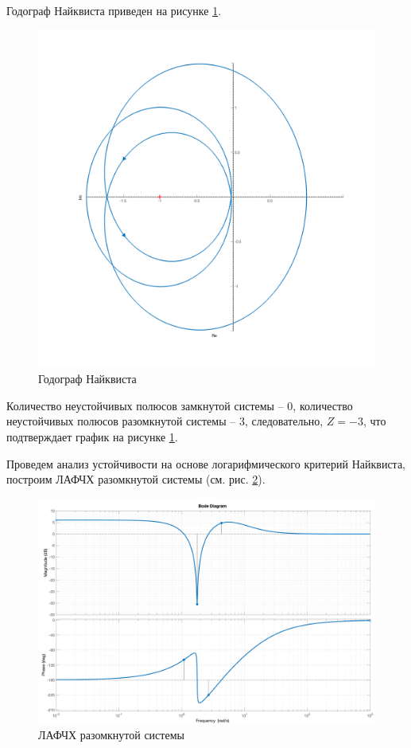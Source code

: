 Годограф Найквиста приведен на рисунке \ref{fig:task3_nyquist}.
\begin{figure}[ht!]
    \centering
    \includegraphics[width=\textwidth]{media/plots/task3_nyquist_open.png}
    \caption{Годограф Найквиста}
    \label{fig:task3_nyquist}
\end{figure}

Количество неустойчивых полюсов замкнутой системы -- 0, количество неустойчивых полюсов разомкнутой системы -- 3, следовательно, $Z = -3$, что подтверждает график на рисунке \ref{fig:task3_nyquist}.

Проведем анализ устойчивости на основе логарифмического критерий Найквиста, построим ЛАФЧХ разомкнутой системы (см. рис. \ref{fig:task3_bode_open}).
\begin{figure}[ht!]
    \centering
    \includegraphics[width=\textwidth]{media/plots/task3_bode_open.png}
    \caption{ЛАФЧХ разомкнутой системы}
    \label{fig:task3_bode_open}
\end{figure}

